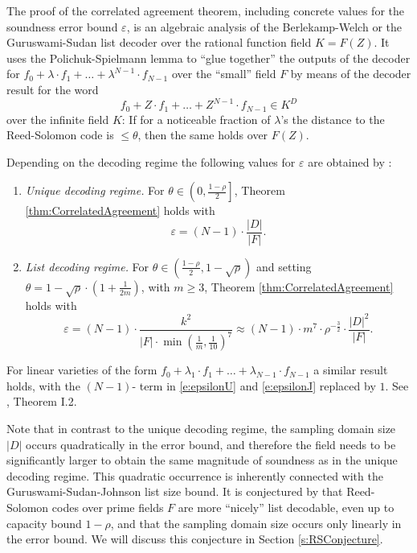 \documentclass[11pt,article,oneside]{memoir}
\theoremstyle{definition}
\theoremstyle{remark}
\begin{document}
The proof of the correlated agreement theorem, including concrete values for the soundness error bound $\varepsilon$, is an algebraic analysis of the Berlekamp-Welch or the Guruswami-Sudan list decoder over the rational function field $K=F(Z)$. 
It uses the Polichuk-Spielmann lemma to “glue together” the outputs of the decoder for $f_0 + \lambda\cdot f_1 + \ldots +\lambda^{N-1}\cdot f_{N-1}$ over the “small” field $F$ by means of the decoder result for the word 
\[
f_0 + Z\cdot f_1 + \ldots + Z^{N-1}\cdot f_{N-1} \in K^D
\]
over the infinite field $K$: 
If for a noticeable fraction of  $\lambda$’s the distance to the Reed-Solomon code is $\leq\theta$, then the same holds over $F(Z)$.

Depending on the decoding regime the following values for $\varepsilon$ are obtained by \cite{ProximityGaps}:
\begin{enumerate}
\item
\textit{Unique decoding regime.} 
For $\theta\in \left(0,\frac{1-\rho}{2}\right]$, Theorem \ref{thm:CorrelatedAgreement} holds with
\begin{equation}
\label{e:epsilonU}
\varepsilon = (N-1)\cdot \frac{|D|}{|F|}.
\end{equation}
\item
\textit{List decoding regime.} 
For $\theta\in \left(\frac{1-\rho}{2},1-\sqrt\rho\right)$ and setting $\theta =1-\sqrt\rho \cdot\left(1 +\frac{1}{2m}\right)$, with $m\geq 3$, Theorem \ref{thm:CorrelatedAgreement} holds with
\begin{equation}
\label{e:epsilonJ}
\varepsilon =  (N-1)\cdot \frac{k^2}{|F|\cdot \min\left(\frac{1}{m}, \frac{1}{10}\right)^7}
\approx (N-1)\cdot m^7\cdot \rho^{-\frac{3}{2}} \cdot \frac{|D|^2}{|F|}.
\end{equation}
\end{enumerate}

For linear varieties of the form $f_0 + \lambda_1\cdot f_1+  \ldots + \lambda_{N-1}\cdot f_{N-1}$ a similar result holds, with the $(N-1)$- term in \eqref{e:epsilonU} and \eqref{e:epsilonJ} replaced by $1$. 
See \cite{ProximityGaps}, Theorem I.2. %

Note that in contrast to the unique decoding regime, the sampling domain size $|D|$ occurs quadratically in the error bound, and therefore the field needs to be significantly larger to obtain the same magnitude of soundness as in the unique decoding regime.  
This quadratic occurrence is inherently connected with the Guruswami-Sudan-Johnson list size bound. 
It is conjectured by \cite{DEEPFRI} that Reed-Solomon codes over prime fields $F$ are more “nicely” list decodable, even up to capacity bound $1-\rho$, and that the sampling domain size occurs only linearly in the error bound. 
We will discuss this conjecture in Section \ref{s:RSConjecture}. 
\end{document}
